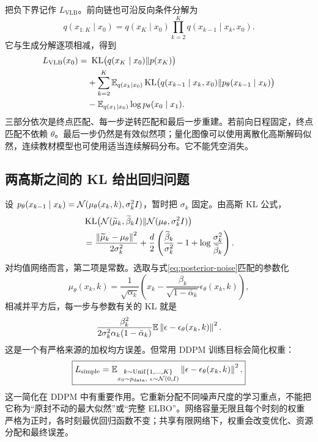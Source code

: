 把负下界记作 $L_{\mathrm{VLB}}$。前向链也可沿反向条件分解为
\begin{equation}
 q(x_{1:K}\mid x_0)=q(x_K\mid x_0)
 \prod_{k=2}^Kq(x_{k-1}\mid x_k,x_0).
\end{equation}
它与生成分解逐项相减，得到
\begin{align}
 L_{\mathrm{VLB}}(x_0)
 =&\ \operatorname{KL}\bigl(q(x_K\mid x_0)\Vert p(x_K)\bigr)\nonumber\\
 &+\sum_{k=2}^K\mathbb{E}_{q(x_k\mid x_0)}
 \operatorname{KL}\bigl(q(x_{k-1}\mid x_k,x_0)\Vert p_\theta(x_{k-1}\mid x_k)\bigr)\nonumber\\
 &-\mathbb{E}_{q(x_1\mid x_0)}\log p_\theta(x_0\mid x_1).
 \label{eq:elbo}
\end{align}
三部分依次是终点匹配、每一步逆转匹配和最后一步重建。若前向日程固定，终点匹配不依赖 $\theta$。最后一步仍然是有效似然项；量化图像可以使用离散化高斯解码似然，连续教材模型也可使用适当连续解码分布。它不能凭空消失。

\subsection{两高斯之间的 KL 给出回归问题}
设 $p_\theta(x_{k-1}\mid x_k)=\mathcal{N}(\mu_\theta(x_k,k),\sigma_k^2 I)$，暂时把 $\sigma_k$ 固定。由高斯 KL 公式，
\begin{align}
 &\operatorname{KL}\bigl(\mathcal{N}(\widetilde\mu_k,\widetilde\beta_k I)
 \Vert\mathcal{N}(\mu_\theta,\sigma_k^2I)\bigr)\nonumber\\
 &=\frac{\left\lVert\widetilde\mu_k-\mu_\theta\right\rVert^2}{2\sigma_k^2}
 +\frac d2\left(\frac{\widetilde\beta_k}{\sigma_k^2}-1+
 \log\frac{\sigma_k^2}{\widetilde\beta_k}\right).
\end{align}
对均值网络而言，第二项是常数。选取与式\eqref{eq:posterior-noise}匹配的参数化
\begin{equation}
 \mu_\theta(x_k,k)=\frac{1}{\sqrt{\alpha_k}}
 \left(x_k-\frac{\beta_k}{\sqrt{1-\bar\alpha_k}}\epsilon_\theta(x_k,k)\right),
\end{equation}
相减并平方后，每一步与参数有关的 KL 就是
\begin{equation}
 \frac{\beta_k^2}{2\sigma_k^2\alpha_k(1-\bar\alpha_k)}
 \mathbb{E}\left\lVert\epsilon-\epsilon_\theta(x_k,k)\right\rVert^2.
 \label{eq:weighted-noise}
\end{equation}
这是一个有严格来源的加权均方误差。但常用 DDPM 训练目标会简化权重：
\begin{equation}\boxed{
 L_{\mathrm{simple}}=\mathbb{E}_{\substack{k\sim\mathrm{Unif}\{1,\ldots,K\}\\
 x_0\sim p_{\mathrm{data}},\ \epsilon\sim\mathcal{N}(0,I)}}
 \left\lVert\epsilon-\epsilon_\theta(x_k,k)\right\rVert^2.
 }\label{eq:simple-loss}\end{equation}
这一简化在 DDPM 中有重要作用\cite{r_ddpm}。它重新分配不同噪声尺度的学习重点，不能把它称为“原封不动的最大似然”或“完整 ELBO”。网络容量无限且每个时刻的权重严格为正时，各时刻最优回归函数不变；共享有限网络下，权重会改变优化、资源分配和最终误差。

